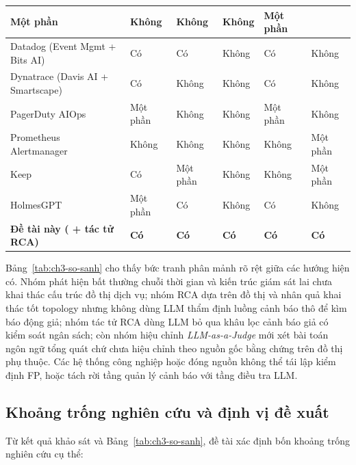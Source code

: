 \begin{table}[htbp]
\begin{tabularx}{\linewidth}{@{}Y >{\centering\arraybackslash}p{1.45cm} >{\centering\arraybackslash}p{1.45cm} >{\centering\arraybackslash}p{1.6cm} >{\centering\arraybackslash}p{1.2cm} >{\centering\arraybackslash}p{1.65cm}@{}}
      Một phần & Không & Không & Không & Một phần \\
    \midrule
    Datadog (Event Mgmt + Bits AI)~\cite{datadog2026docs} &
      Có & Có & Không & Có & Không \\
    Dynatrace (Davis AI + Smartscape)~\cite{dynatrace2026docs} &
      Có & Không & Không & Có & Không \\
    PagerDuty AIOps~\cite{pagerduty2026docs} &
      Một phần & Không & Không & Một phần & Không \\
    Prometheus Alertmanager~\cite{prometheus2026alertmanager} &
      Không & Không & Không & Không & Một phần \\
    Keep~\cite{keep2026docs} &
      Có & Một phần & Không & Không & Một phần \\
    HolmesGPT~\cite{holmesgpt2026docs} &
      Một phần & Có & Không & Có & Không \\
    \midrule
    \textbf{Đề tài này (\CTAV{} + tác tử RCA)} &
      \textbf{Có} & \textbf{Có} & \textbf{Có} & \textbf{Có} & \textbf{Có} \\
    \bottomrule
  \end{tabularx}
\end{table}

Bảng~\ref{tab:ch3-so-sanh} cho thấy bức tranh phân mảnh rõ rệt giữa các hướng hiện có. Nhóm phát hiện bất thường chuỗi thời gian và kiến trúc giám sát lai chưa khai thác cấu trúc đồ thị dịch vụ; nhóm RCA dựa trên đồ thị và nhân quả khai thác tốt topology nhưng không dùng LLM thẩm định luồng cảnh báo thô để kìm báo động giả; nhóm tác tử RCA dùng LLM bỏ qua khâu lọc cảnh báo giả có kiểm soát ngân sách; còn nhóm hiệu chỉnh \emph{LLM-as-a-Judge} mới xét bài toán ngôn ngữ tổng quát chứ chưa hiệu chỉnh theo nguồn gốc bằng chứng trên đồ thị phụ thuộc. Các hệ thống công nghiệp hoặc đóng nguồn không thể tái lập kiểm định FP, hoặc tách rời tầng quản lý cảnh báo với tầng điều tra LLM.

\subsection{Khoảng trống nghiên cứu và định vị đề xuất}
\label{sec:ch3-khoang-trong}

Từ kết quả khảo sát và Bảng~\ref{tab:ch3-so-sanh}, đề tài xác định bốn khoảng trống nghiên cứu cụ thể:

